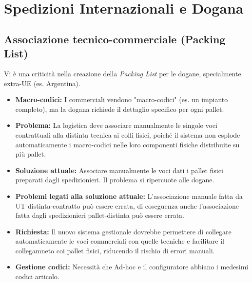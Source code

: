\documentclass[12pt, a4paper]{article} %
\begin{document}
\section{Spedizioni Internazionali e Dogana}

\subsection{Associazione tecnico-commerciale (Packing List)}
Vi è una criticità nella creazione della \textit{Packing List} per le dogane,
specialmente extra-UE (es. Argentina).
\begin{itemize}
    \item \textbf{Macro-codici:} I commerciali vendono "macro-codici" (es. un impianto completo), ma la dogana richiede il dettaglio specifico per ogni pallet.
    \item \textbf{Problema:} La logistica deve associare manualmente le singole voci contrattuali alla distinta tecnica ai colli fisici, poiché il sistema non esplode automaticamente i macro-codici nelle loro componenti fisiche distribuite su più pallet.
    \item \textbf{Soluzione attuale:} Associare manualmente le voci dati i pallet fisici preparati dagli spedizionieri. Il problema si ripercuote alle dogane.
    \item \textbf{Problemi legati alla soluzione attuale:} L'associazione manuale fatta da UT distinta-contratto può essere errata, di coseguenza anche l'associazione fatta dagli spedizionieri pallet-distinta può essere errata.
    \item \textbf{Richiesta:} Il nuovo sistema gestionale dovrebbe permettere di collegare automaticamente le voci commerciali con quelle tecniche e facilitare il collegamneto coi pallet fisici, riducendo il rischio di errori manuali.
    \item \textbf{Gestione codici:} Necessità che Ad-hoc e il configuratore abbiano i medesimi codici articolo.
\end{itemize} 
\end{document}
